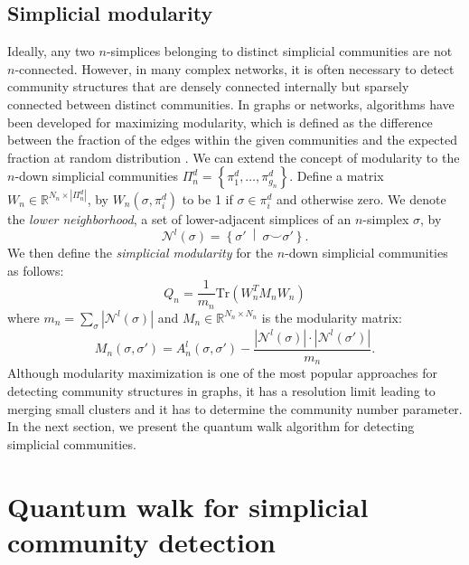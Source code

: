 \documentclass[10pt, letterpaper]{article}
\begin{document}
\subsection{Simplicial modularity}
Ideally, any two $n$-simplices belonging to distinct simplicial communities are not $n$-connected. However, in many complex networks, it is often necessary to detect community structures that are densely connected internally but sparsely connected between distinct communities. In graphs or networks, algorithms have been developed for maximizing modularity, which is defined as the difference between the fraction of the edges within the given communities and the expected fraction at random distribution \cite{Newman2006}. We can extend the concept of modularity to the $n$-down simplicial communities $\Pi_{n}^{d}=\left\{\pi_1^d,\ldots,\pi_{g_{n}}^{d}\right\}$. Define a matrix $W_{n}\in \mathbb{R}^{N_{n}\times |\Pi_{n}^{d}|}$, by $W_{n}(\sigma, \pi_i^d)$ to be 1 if $\sigma\in \pi_i^d$ and otherwise zero. We denote the \textit{lower neighborhood}, a set of lower-adjacent simplices of an $n$-simplex $\sigma$, by
\begin{equation}
\mathcal{N}^{l}(\sigma)=\left\{\sigma'~\middle|~\sigma\smile\sigma' \right\}.
\end{equation}
We then define the \textit{simplicial modularity} for the $n$-down simplicial communities as follows:
\begin{equation} \label{simmodularity}
Q_n=\frac{1}{m_n}\textrm{Tr}\left(W^{T}_{n}M_{n}W_{n}\right)
\end{equation}
where $m_n=\sum_{\sigma} \left|\mathcal{N}^{l}(\sigma)\right|$ and $M_{n}\in\mathbb{R}^{N_{n}\times N_{n}}$ is the modularity matrix:
\begin{equation}
M_{n}(\sigma,\sigma') = A^{l}_{n}(\sigma,\sigma') - \frac{\left|\mathcal{N}^{l}(\sigma)\right|\cdot \left|\mathcal{N}^{l}(\sigma')\right|}{m_n}.
\end{equation}
Although modularity maximization is one of the most popular approaches for detecting community structures in graphs, it has a resolution limit leading to merging small clusters and it has to determine the community number parameter. In the next section, we present the quantum walk algorithm for detecting simplicial communities.



\section{Quantum walk for simplicial community detection} \label{secqw}
\end{document}
